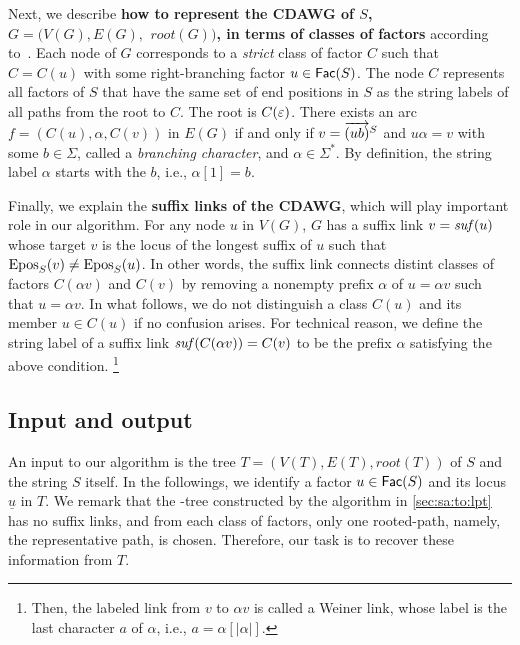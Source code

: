 Next, we describe \textbf{how to represent the CDAWG  of $S$, $G = (V(G), E(G),$ $root(G))$, in terms of classes of factors} according to~\cite{crochemore:verin1997direct}. 
Each node of $G$ corresponds to a \textit{strict} class of factor $C$ such that $C = C(u)$ with some right-branching factor $u \in \mathsf{Fac}{(S)}$. The node $C$ represents all factors of $S$ that have the same set of end positions in $S$ as the string labels of all paths from the root to $C$. The root is $C(\varepsilon)$. There exists an arc $f = (C(u), \alpha, C(v))$ in $E(G)$ if and only if $v = \overrightarrow{(ub)}^{S}$ and $u\alpha = v$ with some $b \in \Sigma$, called a \textit{branching character}, and $\alpha \in \Sigma^*$. By definition, the string label $\alpha$ starts with the  $b$, i.e., $\alpha[1] = b$.  

Finally, we explain the \textbf{suffix links of the CDAWG}, which will play important role in our algorithm. 
For any node $u$ in $V(G)$, $G$ has a suffix link $v = \mathit{suf}(u)$ whose target $v$ is the locus of the longest suffix of $u$ such that $\mathrm{Epos}_{S}(v) \not= \mathrm{Epos}_{S}(u)$. In other words, the suffix link connects distint classes of factors $C(\alpha v)$ and $C(v)$ by removing a nonempty prefix $\alpha$ of $u = \alpha v$ such that $u = \alpha v$. In what follows, we do not distinguish a class $C(u)$ and its member $u \in C(u)$ if no confusion arises.
For technical reason, we define the string label of a suffix link $\mathit{suf}(C(\alpha v)) = C(v)$ to be the prefix $\alpha$ satisfying the above condition.%
\footnote{
Then, the labeled link from $v$ to $\alpha v$ is called a Weiner link, whose label is the last character $a$ of $\alpha$, i.e., $a = \alpha[|\alpha|]$. 
}



\subsection{Input and output}

An input to our algorithm is the \LPTrm tree $T = (V(T), E(T), root(T))$ of $S$ and the string $S$ itself. In the followings, we identify a factor $u\in \mathsf{Fac}{(S)}$ and its locus $\underline{u}$ in $T$. We remark that the \LPTrm-tree constructed by the algorithm in \cref{sec:sa:to:lpt} has no suffix links, and from each class of factors, only one rooted-path, namely, the representative path, is chosen. Therefore, our task is to recover these information from $T$. 

